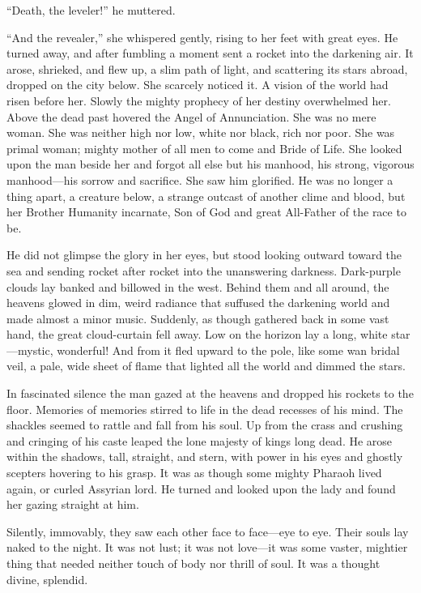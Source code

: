 ``Death, the leveler!'' he muttered.

``And the revealer,'' she whispered gently, rising to her feet
with great eyes. He turned away, and after fumbling a moment
sent a rocket into the darkening air. It arose, shrieked, and
flew up, a slim path of light, and scattering its stars abroad,
dropped on the city below. She scarcely noticed it. A vision of
the world had risen before her. Slowly the mighty prophecy of
her destiny overwhelmed her. Above the dead past hovered the
Angel of Annunciation. She was no mere woman. She was neither
high nor low, white nor black, rich nor poor. She was primal
woman; mighty mother of all men to come and Bride of Life. She
looked upon the man beside her and forgot all else but his
manhood, his strong, vigorous manhood---his sorrow and sacrifice.
She saw him glorified. He was no longer a thing apart, a
creature below, a strange outcast of another clime and blood,
but her Brother Humanity incarnate, Son of God and great
All-Father of the race to be.

He did not glimpse the glory in her eyes, but stood looking
outward toward the sea and sending rocket after rocket into the
unanswering darkness. Dark-purple clouds lay banked and billowed
in the west. Behind them and all around, the heavens glowed in
dim, weird radiance that suffused the darkening world and made
almost a minor music. Suddenly, as though gathered back in some
vast hand, the great cloud-curtain fell away. Low on the horizon
lay a long, white star---mystic, wonderful! And from it fled
upward to the pole, like some wan bridal veil, a pale, wide
sheet of flame that lighted all the world and dimmed the stars.

In fascinated silence the man gazed at the heavens and dropped
his rockets to the floor. Memories of memories stirred to life
in the dead recesses of his mind. The shackles seemed to
rattle and fall from his soul. Up from the crass and crushing
and cringing of his caste leaped the lone majesty of kings
long dead. He arose within the shadows, tall, straight, and
stern, with power in his eyes and ghostly scepters hovering to
his grasp. It was as though some mighty Pharaoh lived again,
or curled Assyrian lord. He turned and looked upon the lady
and found her gazing straight at him.

Silently, immovably, they saw each other face to face---eye to
eye. Their souls lay naked to the night. It was not lust; it was
not love---it was some vaster, mightier thing that needed neither
touch of body nor thrill of soul. It was a thought divine,
splendid.

